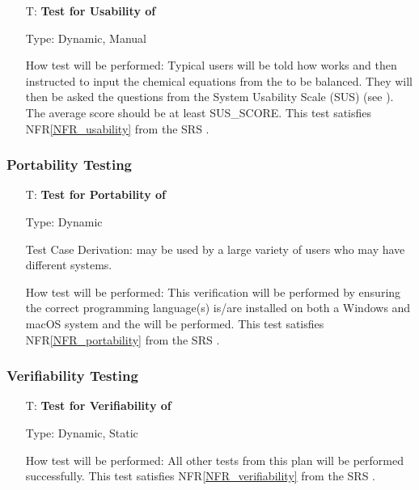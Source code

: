 \documentclass[12pt, titlepage]{article}
\newcounter{testnum} %
\newcommand{\nfrref}[1]{NFR\ref{#1}}
\begin{document}
\begin{enumerate}

  \item[T\refstepcounter{testnum}\thetestnum \label{test_usable}:]
    \textbf{Test for Usability of \progname{}}

    Type: Dynamic, Manual

    How test will be performed: Typical users will be told how \progname{}
    works and then instructed to input the chemical equations from the
     to be balanced. They will then be asked the
    questions from the System Usability Scale (SUS) \cite{thomas_how_2015}
    (see ). The average score should be at least
    SUS\_SCORE. This test satisfies \nfrref{NFR_usability} from
    the SRS \cite{srs}.

\end{enumerate}

\subsubsection{Portability Testing}

\begin{enumerate}

  \item[T\refstepcounter{testnum}\thetestnum \label{test_portable}:]
    \textbf{Test for Portability of \progname{}}

    Type: Dynamic

    Test Case Derivation: \progname{} may be used by a large variety of users
    who may have different systems.

    How test will be performed: This verification will be performed by
    ensuring the correct programming language(s) is/are installed on both a
    Windows and macOS system and the  will be
    performed. This test satisfies \nfrref{NFR_portability} from the SRS
    \cite{srs}.

\end{enumerate}

\subsubsection{Verifiability Testing}

\begin{enumerate}

  \item[T\refstepcounter{testnum}\thetestnum \label{test_verifiable}:]
    \textbf{Test for Verifiability of \progname{}}

    Type: Dynamic, Static

    How test will be performed: All other tests from this plan will be
    performed successfully. This test satisfies \nfrref{NFR_verifiability}
    from the SRS \cite{srs}.

\end{enumerate}
\end{document}
